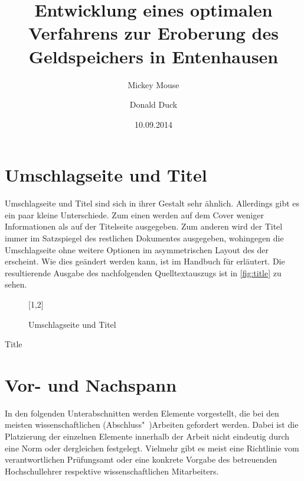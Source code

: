 \documentclass[english,ngerman]{tudscrartcl}
\begin{document}
\section{Umschlagseite und Titel}
Umschlagseite und Titel sind sich in ihrer Gestalt sehr ähnlich. Allerdings 
gibt es ein paar kleine Unterschiede. Zum einen werden auf dem Cover weniger 
Informationen als auf der Titelseite ausgegeben. Zum anderen wird der Titel 
immer im Satzspiegel des restlichen Dokumentes ausgegeben, wohingegen die 
Umschlagseite ohne weitere Optionen im asymmetrischen Layout des \CDs der \TnUD 
erscheint. Wie dies geändert werden kann, ist im Handbuch für  
erläutert. Die resultierende Ausgabe des nachfolgenden Quelltextauszugs ist in 
\autoref{fig:title} zu sehen.
\begin{figure}
[1,2]
\caption{Umschlagseite und Titel}
\label{fig:title}
\end{figure}
\begin{Tutorial!}{Title}
\title{%
  Entwicklung eines optimalen Verfahrens zur Eroberung des
  Geldspeichers in Entenhausen
}
\author{%
  Mickey Mouse
  \and%
  Donald Duck
}
\date{10.09.2014}
\makecover
\maketitle
\end{Tutorial!}



\section{Vor- und Nachspann}
In den folgenden Unterabschnitten werden Elemente vorgestellt, die bei den 
meisten wissenschaftlichen (Abschluss"~)Arbeiten gefordert werden. Dabei ist 
die Platzierung der einzelnen Elemente innerhalb der Arbeit nicht eindeutig 
durch eine Norm oder dergleichen festgelegt. Vielmehr gibt es meist eine 
Richtlinie vom verantwortlichen Prüfungsamt oder eine konkrete Vorgabe des 
betreuenden Hochschullehrer respektive wissenschaftlichen Mitarbeiters. 
\end{document}
